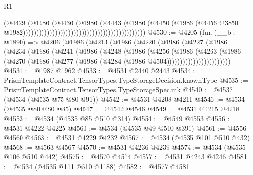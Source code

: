 \begin{lexlean}{R1}
\begin{coremodule}
                                                                              (@4429
                                                                                (@1986
                                                                                  (@4436
                                                                                    (@1986
                                                                                      (@4443
                                                                                        (@1986
                                                                                          (@4450
                                                                                            (@1986
                                                                                              (@4456
                                                                                                @3850
                                                                                                @1982))))))))))))))))))))))))))))))))))))))))))))))
@4530 := @4205
    (fun (__b : @1890) =>
    @4206
      (@1986
        (@4213
          (@1986
            (@4220
              (@1986
                (@4227
                  (@1986
                    (@4234
                      (@1986
                        (@4241
                          (@1986
                            (@4248
                              (@1986
                                (@4256
                                  (@1986
                                    (@4263
                                      (@1986
                                        (@4270
                                          (@1986
                                            (@4277
                                              (@1986 (@4284 (@1986 @4504))))))))))))))))))))))))
@4531 := @1987 @1962
@4533 := @4531 @2440 @2443
@4534 := PrismTemplateContract.TensorTypes.TypeStorageDecision.knownType
@4535 := PrismTemplateContract.TensorTypes.TypeStorageSpec.mk
@4540 := @4533 (@4534 (@4535 @75 @80 @91))
@4542 := @4531 @4208 @4211
@4546 := @4534 (@4535 @80 @80 @85)
@4547 := @4542 @4546
@4549 := @4531 @4215 @4218
@4553 := @4534 (@4535 @85 @510 @314)
@4554 := @4549 @4553
@4556 := @4531 @4222 @4225
@4560 := @4534 (@4535 @49 @510 @391)
@4561 := @4556 @4560
@4563 := @4531 @4229 @4232
@4567 := @4534 (@4535 @101 @510 @432)
@4568 := @4563 @4567
@4570 := @4531 @4236 @4239
@4574 := @4534 (@4535 @106 @510 @442)
@4575 := @4570 @4574
@4577 := @4531 @4243 @4246
@4581 := @4534 (@4535 @111 @510 @1188)
@4582 := @4577 @4581

\end{coremodule}
\end{lexlean}
